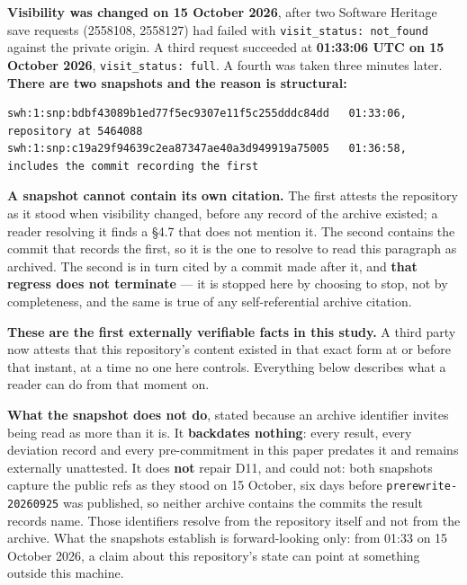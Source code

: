 \documentclass[
  10pt,
]{article}
\begin{document}
\textbf{Visibility was changed on 15 October 2026}, after two Software
Heritage save requests (2558108, 2558127) had failed with
\texttt{visit\_\allowbreak{}status:\ not\_\allowbreak{}found} against the private origin. A third
request succeeded at \textbf{01:33:06 UTC on 15 October 2026},
\texttt{visit\_\allowbreak{}status:\ full}. A fourth was taken three minutes later.
\textbf{There are two snapshots and the reason is structural:}

\begin{verbatim}
swh:1:snp:bdbf43089b1ed77f5ec9307e11f5c255dddc84dd   01:33:06, repository at 5464088
swh:1:snp:c19a29f94639c2ea87347ae40a3d949919a75005   01:36:58, includes the commit recording the first
\end{verbatim}

\textbf{A snapshot cannot contain its own citation.} The first attests
the repository as it stood when visibility changed, before any record of
the archive existed; a reader resolving it finds a \S{}4.7 that does not
mention it. The second contains the commit that records the first, so it
is the one to resolve to read this paragraph as archived. The second is
in turn cited by a commit made after it, and \textbf{that regress does
not terminate} --- it is stopped here by choosing to stop, not by
completeness, and the same is true of any self-referential archive
citation.

\textbf{These are the first externally verifiable facts in this study.}
A third party now attests that this repository's content existed in that
exact form at or before that instant, at a time no one here controls.
Everything below describes what a reader can do from that moment on.

\textbf{What the snapshot does not do}, stated because an archive
identifier invites being read as more than it is. It \textbf{backdates
nothing}: every result, every deviation record and every pre-commitment
in this paper predates it and remains externally unattested. It does
\textbf{not} repair D11, and could not: both snapshots capture the
public refs as they stood on 15 October, six days before
\texttt{prerewrite-20260925} was published, so neither archive contains
the commits the result records name. Those identifiers resolve from the
repository itself and not from the archive. What the snapshots establish
is forward-looking only: from 01:33 on 15 October 2026, a claim about
this repository's state can point at something outside this machine.
\end{document}
